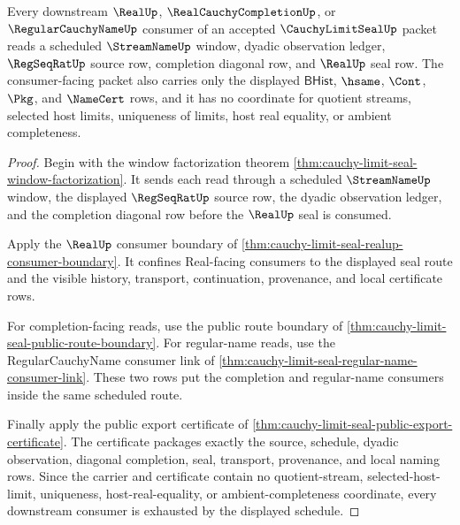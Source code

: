 \begin{theorem}
\label{thm:cauchy-limit-seal-downstream-schedule-exhaustion}
Every downstream $\RealUp$, $\RealCauchyCompletionUp$, or $\RegularCauchyNameUp$ consumer of an accepted $\CauchyLimitSealUp$ packet reads a scheduled $\StreamNameUp$ window, dyadic observation ledger, $\RegSeqRatUp$ source row, completion diagonal row, and $\RealUp$ seal row. The consumer-facing packet also carries only the displayed $\mathsf{BHist}$, $\hsame$, $\Cont$, $\Pkg$, and $\NameCert$ rows, and it has no coordinate for quotient streams, selected host limits, uniqueness of limits, host real equality, or ambient completeness.
\end{theorem}
\begin{proof}
Begin with the window factorization theorem \autoref{thm:cauchy-limit-seal-window-factorization}. It sends each read through a scheduled $\StreamNameUp$ window, the displayed $\RegSeqRatUp$ source row, the dyadic observation ledger, and the completion diagonal row before the $\RealUp$ seal is consumed.

Apply the $\RealUp$ consumer boundary of \autoref{thm:cauchy-limit-seal-realup-consumer-boundary}. It confines Real-facing consumers to the displayed seal route and the visible history, transport, continuation, provenance, and local certificate rows.

For completion-facing reads, use the public route boundary of \autoref{thm:cauchy-limit-seal-public-route-boundary}. For regular-name reads, use the RegularCauchyName consumer link of \autoref{thm:cauchy-limit-seal-regular-name-consumer-link}. These two rows put the completion and regular-name consumers inside the same scheduled route.

Finally apply the public export certificate of \autoref{thm:cauchy-limit-seal-public-export-certificate}. The certificate packages exactly the source, schedule, dyadic observation, diagonal completion, seal, transport, provenance, and local naming rows. Since the carrier and certificate contain no quotient-stream, selected-host-limit, uniqueness, host-real-equality, or ambient-completeness coordinate, every downstream consumer is exhausted by the displayed schedule.
\end{proof}

